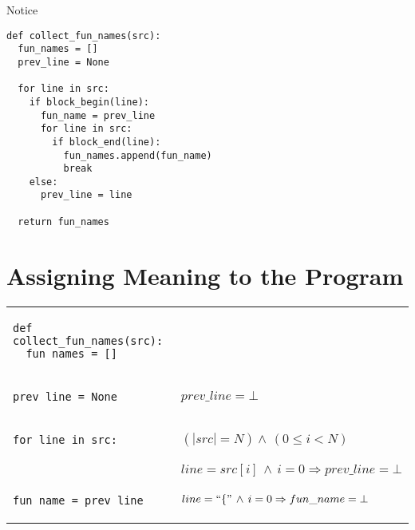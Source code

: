 \documentclass[10pt, a4paper]{article}
\begin{document}
Notice 

\begin{lstlisting}
def collect_fun_names(src):
  fun_names = []
  prev_line = None

  for line in src:
    if block_begin(line):
      fun_name = prev_line
      for line in src:
        if block_end(line):
          fun_names.append(fun_name)
          break
    else:
      prev_line = line

  return fun_names
\end{lstlisting}

\section{Assigning Meaning to the Program}
\noindent
\noindent\hspace*{-0.5em}\begin{tabular}{@{}ll@{}}
{\noindent\lstset{language=Python, basicstyle=\ttfamily\small, numbers=left}
\noindent\begin{lstlisting}
def collect_fun_names(src):
  fun_names = []
\end{lstlisting}}
&\\

{\noindent\lstset{language=Python, numbers=left, backgroundcolor=\color{lightgreen}}
\begin{lstlisting}[firstnumber=3]
  prev_line = None
\end{lstlisting}}
&$prev\_line = \bot$\\

{\noindent\lstset{numbers=left, backgroundcolor=\color{lightgreen}}
\noindent\begin{lstlisting}[firstnumber=last]
  for line in src:
\end{lstlisting}}
& $(|src| = N) \wedge\,(0 \le i < N) $\\

\noindent\lstset{backgroundcolor=\color{lightgreen}}
\noindent{\begin{lstlisting}[firstnumber=last]
    if open_curly(line):
\end{lstlisting}}
& $line = src[i]\,\wedge\,i = 0 \Rightarrow prev\_line = \bot$\\

\noindent\lstset{backgroundcolor=\color{lightgreen}}
{\begin{lstlisting}[firstnumber=last]
      fun_name = prev_line
\end{lstlisting}}
&$line = ``\{" \,\wedge\,i = 0 \Rightarrow fun\_name = \bot $\\


\end{tabular}
\end{document}
